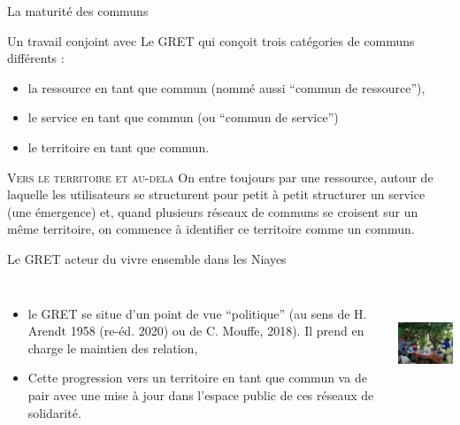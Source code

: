 \documentclass[newPxFont]{beamer}
\begin{document}
  \begin{frame}[c]{La maturité des communs}
      \vspace{-1cm}
      
    Un travail conjoint avec Le GRET qui conçoit trois catégories de communs différents :
      \begin{itemize}
          \item la ressource en tant que commun (nommé aussi “commun de ressource”),
          \item le service en tant que commun (ou “commun de service”)
          \item le territoire en tant que commun.
      \end{itemize}
      
       \small{
         \begin{alertblock}{\textsc{Vers le territoire et au-dela}}
           On entre toujours par une ressource, autour de laquelle les utilisateurs se structurent pour petit à petit structurer un service (une émergence) et, quand plusieurs réseaux de communs se croisent sur un même territoire, on commence à identifier ce territoire comme un commun.
         \end{alertblock}
       }
  \end{frame}
      
  \begin{frame}[c]{Le GRET acteur du vivre ensemble dans les Niayes}
      \vspace{-1cm}
      \begin{columns}[onlytextwidth,T]
        \column{\dimexpr\linewidth-30mm-5mm}
        \begin{itemize}
            \item le GRET se situe d’un point de vue “politique” (au sens de H. Arendt 1958 (re-éd. 2020) ou de C. Mouffe, 2018). Il prend en charge le maintien des relation,
            \item Cette progression vers un territoire en tant que commun va de pair avec une mise à jour dans l’espace public de ces réseaux de solidarité.
        \end{itemize}
        \column{30mm}
        \vspace{0.5cm}
         \includegraphics[height=3cm]{img/atelier_montroland.jpg}
      \end{columns}
  \end{frame}
      
\end{document}
